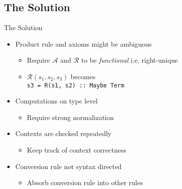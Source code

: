 \documentclass{beamer}
\begin{document}
\subsection{The Solution}

\begin{frame}{The Solution}

  \begin{itemize}

    \item
      Product rule and axioms might be ambiguous

      \begin{itemize}
        \item Require $\mathcal{A}$ and $\mathcal{R}$ to be \emph{functional} i.e. right-unique
        \item $\mathcal{R}(s_1, s_2, s_3)$ becomes \\
              \texttt{s3 = R(s1, s2) :: Maybe Term}
      \end{itemize}

    \item Computations on type level
      \begin{itemize}
        \item Require strong normalization
      \end{itemize}

    \item Contexts are checked repeatedly
      \begin{itemize}
        \item Keep track of context correctness
      \end{itemize}

    \item Conversion rule not syntax directed
      \begin{itemize}
        \item Absorb conversion rule into other rules
      \end{itemize}
  \end{itemize}

\end{frame}


\newcommand{\vcdash}{\vdash_{vc}}
\newcommand{\vtdash}{\vdash_{vt}}
\end{document}
